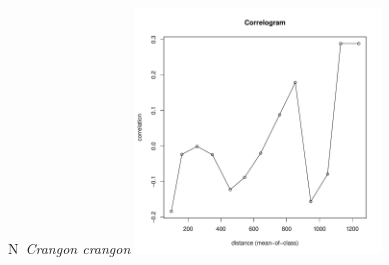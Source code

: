 \documentclass[12pt, a4paper]{disser}
\begin{document}
	\begin{figure}[h]

	\begin{minipage}[b]{.46\linewidth}
	\begin{center}
	{\small N~{\it Crangon crangon}}
		\includegraphics[width=65mm]{../Barenc_Sea/distribution_Moran/Pala_moran_N_Crangon_crangon_.pdf}
	\end{center}
	\end{minipage}
%
%

	



\end{figure}
\end{document}
